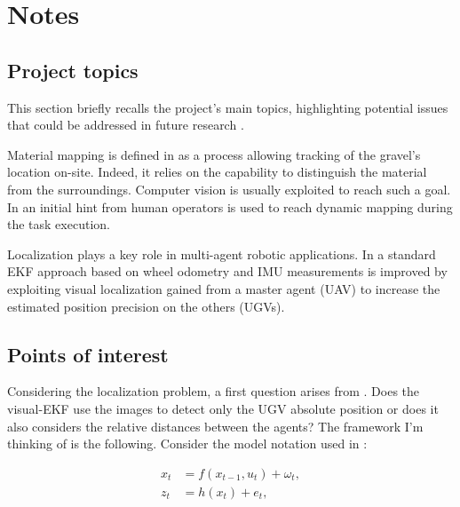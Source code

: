 
\section{Notes}

\subsection{Project topics}
\label{subscn:proj_topics}
This section briefly recalls the project's main topics, highlighting potential issues that could be addressed in future research \cite{Oren2022}.

\newline
Material mapping is defined in \cite{Oren2022} as a process allowing tracking of the gravel's location on-site. Indeed, it relies on the capability to distinguish the material from the surroundings. Computer vision is usually exploited to reach such a goal. In \cite{Oren2022} an initial hint from human operators is used to reach dynamic mapping during the task execution.

\newline
Localization plays a key role in multi-agent robotic applications. In \cite{Oren2022} a standard EKF approach based on wheel odometry and IMU measurements is improved by exploiting visual localization gained from a master agent (UAV) to increase the estimated position precision on the others (UGVs).

\subsection{Points of interest}
\label{subscn:points_interest}

\newline
Considering the localization problem, a first question arises from \cite{Oren2022}. Does the visual-EKF use the images to detect only the UGV absolute position or does it also considers the relative distances between the agents? The framework I'm thinking of is the following. Consider the model notation used in \cite{Oren2022}:

\begin{subequations}
    \label{eqn:model_ss}
    \begin{align}
        x_t &= f(x_{t-1},u_t) + \omega_t, \\
        z_t &= h(x_t) + e_t,
    \end{align}
\end{subequations}

